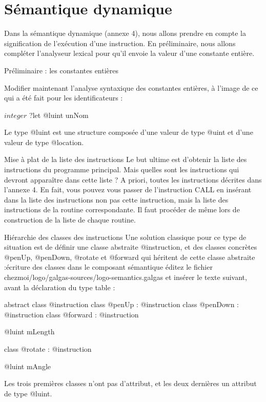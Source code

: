\section{Sémantique dynamique}

Dans la sémantique dynamique (annexe 4), nous allons prendre en compte la signification de l'exécution d'une instruction. En préliminaire, nous allons compléter l'analyseur lexical pour qu'il envoie la valeur d'une constante entière.

Préliminaire : les constantes entières

Modifier maintenant l’analyse syntaxique des constantes entières, à l’image de ce qui a été fait pour les identificateurs :
\begin{galgascode}
$integer$ ?let @luint unNom
\end{galgascode}

Le type @luint est une structure composée d’une valeur de type @uint et d’une valeur de type @location.

Mise à plat de la liste des instructions
Le but ultime est d'obtenir la liste des instructions du programme principal. Mais quelles sont les instructions qui devront apparaître dans cette liste ? A priori, toutes les instructions décrites dans l'annexe 4. En fait, vous pouvez vous passer de l'instruction CALL en insérant dans la liste des instructions non pas cette instruction, mais la liste des instructions de la routine correspondante. Il faut procéder de même lors de construction de la liste de chaque routine.

Hiérarchie des classes des instructions
Une solution classique pour ce type de situation est de définir une classe abstraite @instruction, et des classes concrètes @penUp, @penDown, @rotate et @forward qui héritent de cette classe abstraite :écriture des classes dans le composant sémantique éditez le fichier chezmoi/logo/galgas-sources/logo-semantics.galgas et insérer le texte suivant, avant la déclaration du type table :

\begin{galgascode}
abstract class @instruction {
}
class @penUp : @instruction {
}
class @penDown : @instruction {
}
class @forward : @instruction {

@luint mLength
}
class @rotate : @instruction {

@luint mAngle
}
\end{galgascode}


Les trois premières classes n'ont pas d'attribut, et les deux dernières un attribut de type @luint.

